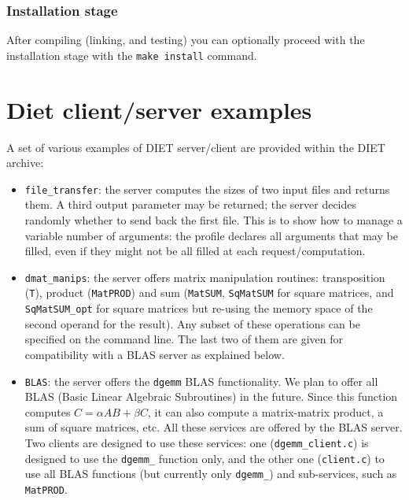 \subsubsection{Installation stage}
After compiling (linking, and testing) you can optionally proceed with
the installation stage with the \verb+make install+ command.

\section{Diet client/server examples}
\label{section:diet-examples}

A set of various examples of DIET server/client are provided within
the DIET archive:
\begin{itemize}
\item{\texttt{file\_transfer}}: the server computes the sizes of two
  input files and returns them. A third output parameter may be
  returned; the server decides randomly whether to send back the
  first file. This is to show how to manage a variable number of
  arguments: the profile declares all arguments that may be filled,
  even if they might not be all filled at each request/computation.

\item{\texttt{dmat\_manips}}: the server offers matrix manipulation
  routines: transposition (\texttt{T}), product (\texttt{MatPROD}) and
  sum (\texttt{MatSUM}, \texttt{SqMatSUM} for square matrices, and
  \texttt{SqMatSUM\_opt} for square matrices but re-using the memory
  space of the second operand for the result). Any subset of these
  operations can be specified on the command line. The last two of
  them are given for compatibility with a BLAS server as explained below.
  
\item{\texttt{BLAS}}: the server offers the \texttt{dgemm} BLAS
  functionality.  We plan to offer all BLAS (Basic Linear Algebraic
  Subroutines) in the future. Since this function computes
  $C = \alpha AB + \beta C$, it can also compute a matrix-matrix
  product, a sum of square matrices, etc. All these services are
  offered by the BLAS server. Two clients are designed to use these
  services: one (\texttt{dgemm\_client.c}) is designed to use the
  \texttt{dgemm\_} function only, and the other one
  (\texttt{client.c}) to use all BLAS functions (but currently only
  \texttt{dgemm\_}) and sub-services, such as \texttt{MatPROD}.
  

\end{itemize}
